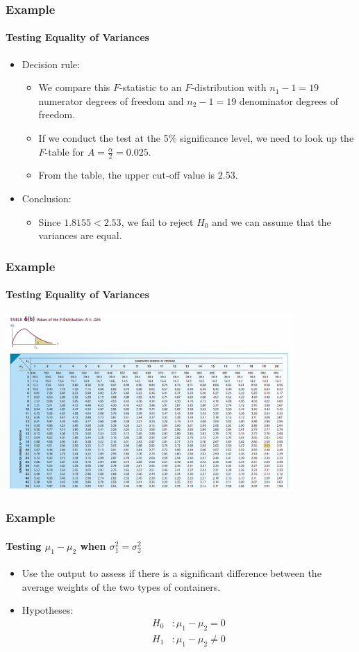 \documentclass[12pt]{beamer}
\begin{document}
	\begin{frame}
		\frametitle{Example}
		\framesubtitle{Testing Equality of Variances}
		
		\begin{itemize}[label={\color{blue}$\blacktriangleright$}]
			\item Decision rule:
			\begin{itemize}[label={\color{blue}$\blacktriangleright$}]
				\item We compare this $F$-statistic to an $F$-distribution with $n_1 - 1 = 19$ numerator degrees of freedom and $n_2 - 1 = 19$ denominator degrees of freedom.
				\item If we conduct the test at the 5\% significance level, we need to look up the $F$-table for $A = \frac{\alpha}{2} = 0.025$.
				\item From the table, the upper cut-off value is 2.53.
			\end{itemize}
			\item Conclusion:
			\begin{itemize}[label={\color{blue}$\blacktriangleright$}]
				\item Since $1.8155 < 2.53$, we fail to reject $H_0$ and we can assume that the variances are equal.
			\end{itemize}
		\end{itemize}
		
	\end{frame}
		\begin{frame}
		\frametitle{Example}
		\framesubtitle{Testing Equality of Variances}
\centering
\includegraphics[width=11cm]{fstat2.png}	

	\end{frame}
	\begin{frame}
		\frametitle{Example}
		\framesubtitle{Testing $\mu_1 - \mu_2$ when $\sigma_1^2 = \sigma_2^2$}
		
		\begin{itemize}[label={\color{blue}$\blacktriangleright$}]
			\item Use the output to assess if there is a significant difference between the average weights of the two types of containers.
			\item Hypotheses:
			\[
			\begin{aligned}
				H_0 &: \mu_1 - \mu_2 = 0 \\
				H_1 &: \mu_1 - \mu_2 \neq 0
			\end{aligned}
			\]
		\end{itemize}
		
	\end{frame}
\end{document}
